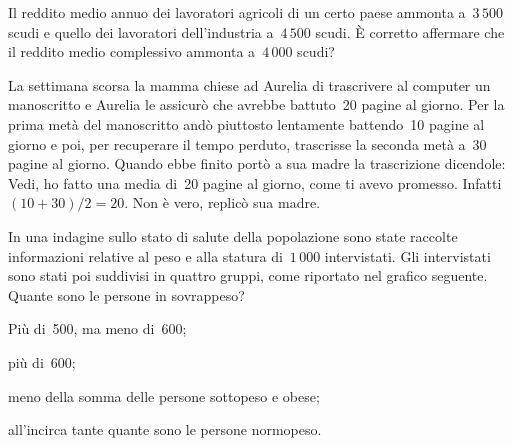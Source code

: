 \begin{esercizio}
\label{ese:A.48}
Il reddito medio annuo dei lavoratori agricoli di un certo paese ammonta a~$3\,500$ scudi e quello dei lavoratori dell'industria
a~$4\,500$ scudi. È corretto affermare che il reddito medio complessivo ammonta a~$4\,000$ scudi?
\end{esercizio}

\begin{esercizio}
\label{ese:A.49}
La settimana scorsa la mamma chiese ad Aurelia di trascrivere al computer un manoscritto e Aurelia le assicurò che avrebbe
battuto~20 pagine al giorno. Per la prima metà del manoscritto andò piuttosto lentamente battendo~10 pagine al giorno e poi,
per recuperare il tempo perduto, trascrisse la seconda metà a~30 pagine al giorno.
Quando ebbe finito portò a sua madre la trascrizione dicendole: Vedi, ho fatto una media di~20 pagine al giorno,
come ti avevo promesso. Infatti~$(10+30)/2=20$. Non è vero, replicò sua madre.
\end{esercizio}

\begin{esercizio}
\label{ese:A.50}
In una indagine sullo stato di salute della popolazione sono state raccolte informazioni relative al peso e
alla statura di~$1\,000$ intervistati. Gli intervistati sono stati poi suddivisi in quattro gruppi,
come riportato nel grafico seguente. Quante sono le persone in sovrappeso?

\begin{enumeratea}
 \item Più di~500, ma meno di~600;
 \item più di~600;
 \item meno della somma delle persone sottopeso e obese;
 \item all'incirca tante quante sono le persone normopeso.
\end{enumeratea}
\begin{center}
 
\end{center}

\end{esercizio}

